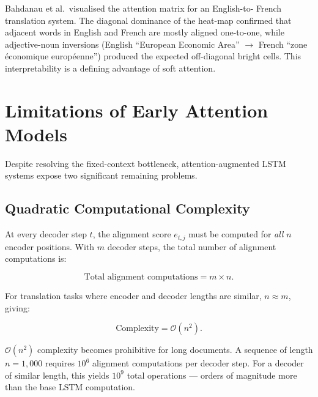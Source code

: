 \documentclass[12pt,a4paper]{article}
\begin{document}
\begin{example}[title=English-to-French Alignment Heat-map]
  Bahdanau et al.\ visualised the attention matrix for an English-to-
  French translation system.  The diagonal dominance of the heat-map
  confirmed that adjacent words in English and French are mostly
  aligned one-to-one, while adjective-noun inversions (English
  ``European Economic Area'' $\to$ French ``zone \'{e}conomique
  europ\'{e}enne'') produced the expected off-diagonal bright cells.
  This interpretability is a defining advantage of soft attention.
\end{example}

\section{Limitations of Early Attention Models}
\label{sec:limitations}

Despite resolving the fixed-context bottleneck, attention-augmented
LSTM systems expose two significant remaining problems.

\subsection{Quadratic Computational Complexity}

At every decoder step $t$, the alignment score $e_{t,j}$ must be
computed for \emph{all} $n$ encoder positions.  With $m$ decoder
steps, the total number of alignment computations is:

\begin{equation}
  \text{Total alignment computations} = m \times n.
  \label{eq:complexity-product}
\end{equation}

For translation tasks where encoder and decoder lengths are similar,
$n \approx m$, giving:

\begin{equation}
  \text{Complexity} = \mathcal{O}(n^2).
  \label{eq:complexity-n2}
\end{equation}

\begin{warningbox}
  $\mathcal{O}(n^2)$ complexity becomes prohibitive for long
  documents.  A sequence of length $n = 1{,}000$ requires
  $10^6$ alignment computations per decoder step.  For a decoder of
  similar length, this yields $10^9$ total operations --- orders of
  magnitude more than the base LSTM computation.
\end{warningbox}
\end{document}

